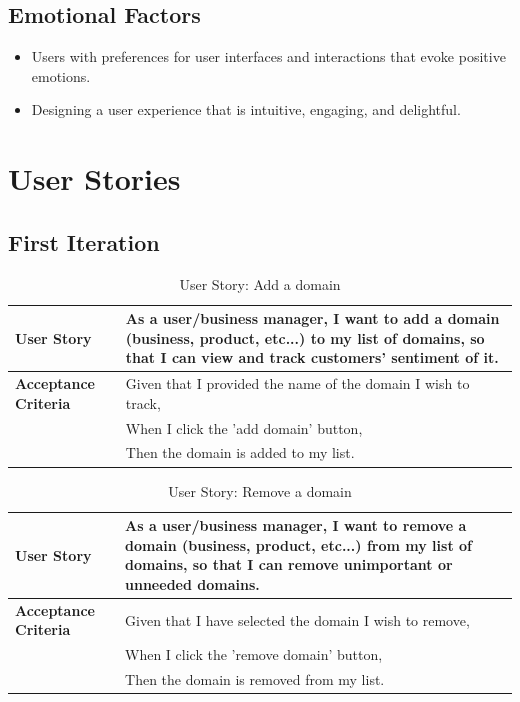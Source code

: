 \documentclass[12pt]{article}
\begin{document}
\subsection{Emotional Factors}
\begin{itemize}
  \item Users with preferences for user interfaces and interactions that evoke positive emotions.
  \item Designing a user experience that is intuitive, engaging, and delightful.
\end{itemize}

\newpage
















\section{User Stories}

\subsection{First Iteration}
\begin{table}[htbp]
\caption{User Story: Add a domain}
\begin{tabular}{|p{}|p{}|}
\hline
\textbf{User Story} & As a user/business manager, I want to add a domain (business, product, etc...) to my list of domains, so that I can view and track customers' sentiment of it. \\
\hline
\textbf{Acceptance Criteria} & 
Given that I provided the name of the domain I wish to track,\\
& When I click the 'add domain' button,\\
& Then the domain is added to my list. \\
\hline
\end{tabular}
\end{table}

\begin{table}[htbp]
\caption{User Story: Remove a domain}
\begin{tabular}{|p{}|p{}|}
\hline
\textbf{User Story} & As a user/business manager, I want to remove a domain (business, product, etc...) from my list of domains, so that I can remove unimportant or unneeded domains. \\
\hline
\textbf{Acceptance Criteria} & 
Given that I have selected the domain I wish to remove,\\
& When I click the 'remove domain' button,\\
& Then the domain is removed from my list. \\
\hline
\end{tabular}
\end{table}
\end{document}
